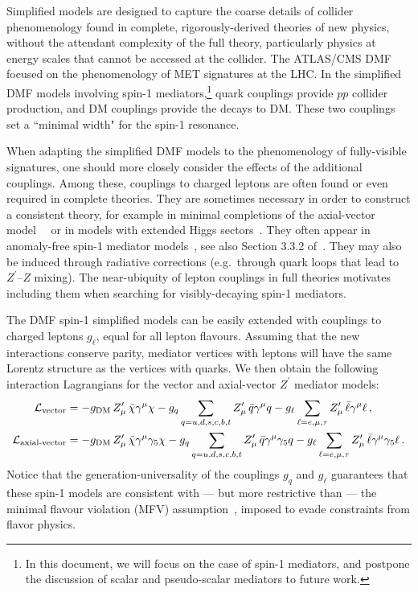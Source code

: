\documentclass[review]{elsarticle}
\newcommand{\gDM}{\ensuremath{g_{\rm{DM}}}\xspace}
\newcommand{\gq}{\ensuremath{g_q}\xspace}
\begin{document}
Simplified models are designed to capture the coarse details of collider phenomenology found in complete, rigorously-derived theories of new physics, without the attendant complexity of the full theory, particularly physics at energy scales that cannot be accessed at the collider. The ATLAS/CMS DMF focused on the phenomenology of MET signatures at the LHC. In the simplified DMF models involving spin-1 mediators,\footnote{In this document, we will focus on the case of spin-1 mediators, and postpone the discussion of scalar and pseudo-scalar mediators to future work.} quark couplings provide $pp$ collider production, and DM couplings provide the decays to DM. These two couplings set a ``minimal width" for the spin-1 resonance. 

When adapting the simplified DMF models to the phenomenology of fully-visible signatures, one should more closely consider the effects of the additional%
couplings. Among these, couplings to charged leptons are often found or even required in complete theories. They are sometimes necessary in order to construct a consistent theory, for example in minimal completions of the axial-vector model~~\cite{Kahlhoefer:2015bea,Jacques:2016dqz} or in models with extended Higgs sectors~\cite{Arcadi:2013qia,Bauer:2016gys}. They often appear in anomaly-free spin-1 mediator models~\cite{Carena:2004xs}, see also Section 3.3.2 of~\cite{Boveia:2016mrp}. They may also be induced through radiative corrections (e.g.~through quark loops that lead to $Z^\prime$--$Z$ mixing). The near-ubiquity of lepton couplings in full theories motivates including them when searching for visibly-decaying spin-1 mediators.

The DMF spin-1 simplified models can be easily extended with couplings to charged leptons $g_\ell$, equal for all lepton flavours. Assuming that the new interactions conserve parity, mediator vertices with leptons will have the same Lorentz structure as the vertices with quarks. We then obtain the following interaction Lagrangians for the vector and axial-vector $Z^\prime$ mediator models:
\begin{align}
\label{eq:AV1}
\mathcal{L}_{\text{vector}} &=- \gDM \, Z^\prime_{\mu} \, \bar{\chi}\gamma^{\mu}\chi -   \gq  \sum_{q=u,d,s,c,b,t} Z^\prime_{\mu} \, \bar{q}\gamma^{\mu}q  - g_\ell  \sum_{\ell=e,\mu,\tau} Z^\prime_{\mu} \, \bar{\ell}\gamma^{\mu}\ell\,, \\
\label{eq:AV2} 
\mathcal{L}_{\text{axial-vector}}&=- \gDM \, Z^\prime_{\mu} \, \bar{\chi}\gamma^{\mu}\gamma_5\chi - \gq \sum_{q=u,d,s,c,b,t} Z^\prime_{\mu} \, \bar{q}\gamma^{\mu}\gamma_5q
-  g_\ell  \sum_{\ell=e,\mu,\tau} Z^\prime_{\mu} \, \bar{\ell}\gamma^{\mu}\gamma_5\ell\,.
\end{align}
Notice that the generation-universality of the couplings $\gq$ and $g_\ell$ guarantees that these spin-1 models are consistent with --- but more restrictive than --- the minimal flavour violation (MFV) assumption~\cite{D'Ambrosio:2002ex}, imposed to evade constraints from flavor physics. 
\end{document}
